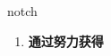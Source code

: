 
\begin{frame}
{\huge notch}
\begin{center}
\begin{enumerate}\Large
  \item \textbf{通过努力获得}
\end{enumerate}
\end{center}
\end{frame}
